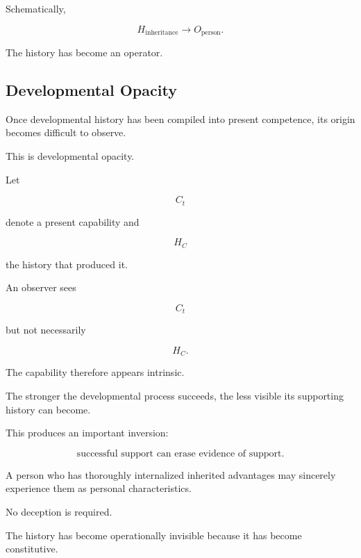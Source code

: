 \documentclass[11pt]{article}
\theoremstyle{remark}
\begin{document}
Schematically,

\begin{equation}
H_{\mathrm{inheritance}}
\longrightarrow
O_{\mathrm{person}}.
\end{equation}

The history has become an operator.

\subsection{Developmental Opacity}

Once developmental history has been compiled into present competence, its origin becomes difficult to observe.

This is developmental opacity.

Let

\begin{equation}
C_t
\end{equation}

denote a present capability and

\begin{equation}
H_C
\end{equation}

the history that produced it.

An observer sees

\begin{equation}
C_t
\end{equation}

but not necessarily

\begin{equation}
H_C.
\end{equation}

The capability therefore appears intrinsic.

The stronger the developmental process succeeds, the less visible its supporting history can become.

This produces an important inversion:

\begin{equation}
\boxed{
\text{successful support can erase evidence of support}.
}
\end{equation}

A person who has thoroughly internalized inherited advantages may sincerely experience them as personal characteristics.

No deception is required.

The history has become operationally invisible because it has become constitutive.
\end{document}
